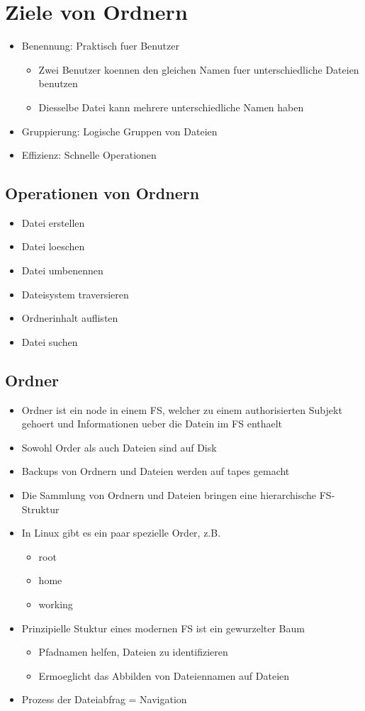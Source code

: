 \documentclass[a4paper]{scrreprt}
\begin{document}
\section{Ziele von Ordnern}
\begin{itemize}
	\item Benennung: Praktisch fuer Benutzer
		\begin{itemize}
			\item Zwei Benutzer koennen den gleichen Namen fuer unterschiedliche Dateien benutzen
			\item Diesselbe Datei kann mehrere unterschiedliche Namen haben
		\end{itemize}
	\item Gruppierung: Logische Gruppen von Dateien
	\item Effizienz: Schnelle Operationen
\end{itemize}

\subsection{Operationen von Ordnern}
\begin{itemize}
	\item Datei erstellen
	\item Datei loeschen
	\item Datei umbenennen
	\item Dateisystem traversieren
	\item Ordnerinhalt auflisten
	\item Datei suchen
\end{itemize}

\subsection{Ordner}
\begin{itemize}
	\item Ordner ist ein node in einem FS, welcher zu einem authorisierten Subjekt gehoert und Informationen ueber die Datein im FS enthaelt
	\item Sowohl Order als auch Dateien sind auf Disk
	\item Backups von Ordnern und Dateien werden auf tapes gemacht
	\item Die Sammlung von Ordnern und Dateien bringen eine hierarchische FS-Struktur
	\item In Linux gibt es ein paar spezielle Order, z.B.
		\begin{itemize}
			\item root
			\item home
			\item working
		\end{itemize}
	\item Prinzipielle Stuktur eines modernen FS ist ein gewurzelter Baum
		\begin{itemize}
			\item Pfadnamen helfen, Dateien zu identifizieren
			\item Ermoeglicht das Abbilden von Dateiennamen auf Dateien
		\end{itemize}
	\item Prozess der Dateiabfrag = Navigation
\end{itemize}
\end{document}

